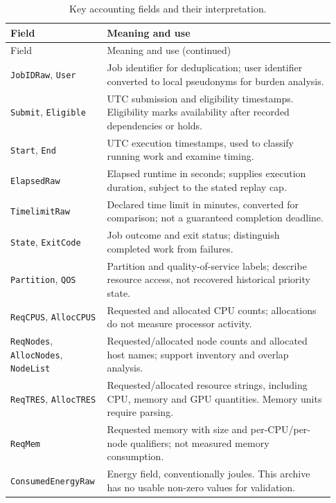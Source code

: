 \begin{longtable}{@{}>{\raggedright\arraybackslash}p{0.25\linewidth}>{\raggedright\arraybackslash}p{0.68\linewidth}@{}}
\caption{Key accounting fields and their interpretation.}\label{tab:accounting-fields}\\
\toprule Field & Meaning and use\\\midrule\endfirsthead
\toprule Field & Meaning and use (continued)\\\midrule\endhead
\bottomrule\endfoot
\texttt{JobIDRaw}, \texttt{User} & Job identifier for deduplication; user identifier converted to local pseudonyms for burden analysis.\\
\texttt{Submit}, \texttt{Eligible} & UTC submission and eligibility timestamps. Eligibility marks availability after recorded dependencies or holds.\\
\texttt{Start}, \texttt{End} & UTC execution timestamps, used to classify running work and examine timing.\\
\texttt{ElapsedRaw} & Elapsed runtime in seconds; supplies execution duration, subject to the stated replay cap.\\
\texttt{TimelimitRaw} & Declared time limit in minutes, converted for comparison; not a guaranteed completion deadline.\\
\texttt{State}, \texttt{ExitCode} & Job outcome and exit status; distinguish completed work from failures.\\
\texttt{Partition}, \texttt{QOS} & Partition and quality-of-service labels; describe resource access, not recovered historical priority state.\\
\texttt{ReqCPUS}, \texttt{AllocCPUS} & Requested and allocated CPU counts; allocations do not measure processor activity.\\
\texttt{ReqNodes}, \texttt{AllocNodes}, \texttt{NodeList} & Requested/allocated node counts and allocated host names; support inventory and overlap analysis.\\
\texttt{ReqTRES}, \texttt{AllocTRES} & Requested/allocated resource strings, including CPU, memory and GPU quantities. Memory units require parsing.\\
\texttt{ReqMem} & Requested memory with size and per-CPU/per-node qualifiers; not measured memory consumption.\\
\texttt{ConsumedEnergyRaw} & Energy field, conventionally joules. This archive has no usable non-zero values for validation.\\
\end{longtable}
